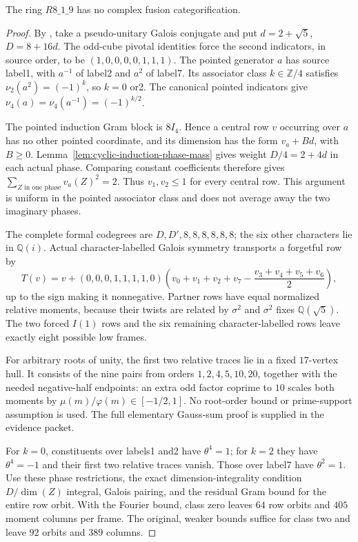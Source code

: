 \begin{theorem}\label{thm:r9-center-trace}
The ring $R8\_1\_9$ has no complex fusion categorification.
\end{theorem}
\begin{proof}
By \cite[Lemma~3.1]{SchNear}, take a pseudo-unitary Galois conjugate
and put $d=2+\sqrt5$, $D=8+16d$. The odd-cube pivotal identities
force the second indicators, in source order, to be
$(1,0,0,0,0,1,1,1)$. The pointed generator $a$ has source label1,
with $a^{-1}$ of label2 and $a^2$ of label7. Its associator class
$k\in\mathbb Z/4$ satisfies $\nu_2(a^2)=(-1)^k$, so $k=0$ or2.
The canonical pointed indicators give
$\nu_4(a)=\nu_4(a^{-1})=(-1)^{k/2}$.

The pointed induction Gram block is $8I_4$. Hence a central row
$v$ occurring over $a$ has no other pointed coordinate, and its
dimension has the form $v_a+Bd$, with $B\geq0$.
Lemma~\ref{lem:cyclic-induction-phase-mass} gives weight
$D/4=2+4d$ in each actual phase. Comparing constant coefficients
therefore gives $\sum_{Z\text{ in one phase}}v_a(Z)^2=2$.
Thus $v_1,v_2\leq1$ for every central row. This argument is uniform
in the pointed associator class and does not average away the two
imaginary phases.

The complete formal codegrees are $D,D',8,8,8,8,8,8$;
the six other characters lie in $\mathbb Q(i)$. Actual
character-labelled Galois symmetry transports a forgetful row by
\[
 T(v)=v+(0,0,0,1,1,1,1,0)
 \left(v_0+v_1+v_2+v_7-\frac{v_3+v_4+v_5+v_6}{2}\right),
\]
up to the sign making it nonnegative. Partner rows have equal
normalized relative moments, because their twists are related by
$\sigma^2$ and $\sigma^2$ fixes $\mathbb Q(\sqrt5)$.
The two forced $I(1)$ rows and the six remaining
character-labelled rows leave exactly eight possible low frames.

For arbitrary roots of unity, the first two relative traces lie
in a fixed $17$-vertex hull. It consists of the nine pairs from
orders $1,2,4,5,10,20$, together with the needed negative-half
endpoints: an extra odd factor coprime to $10$ scales both moments
by $\mu(m)/\varphi(m)\in[-1/2,1]$. No root-order bound or
prime-support assumption is used. The full elementary Gauss-sum
proof is supplied in the evidence packet.

For $k=0$, constituents over labels1 and2 have $\theta^4=1$;
for $k=2$ they have $\theta^4=-1$ and their first two relative
traces vanish. Those over label7 have $\theta^2=1$.
Use these phase restrictions, the exact dimension-integrality
condition $D/\dim(Z)$ integral, Galois pairing, and the residual
Gram bound for the entire row orbit. With the Fourier bound,
class zero leaves $64$ row orbits and $405$ moment columns per
frame. The original, weaker bounds suffice for class two and leave
$92$ orbits and $389$ columns.


\end{proof}

